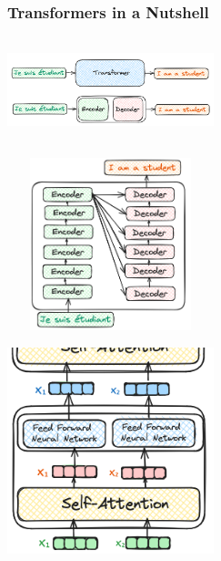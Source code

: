 \documentclass{article}
\begin{document}
\subsubsection{Transformers in a Nutshell}
\begin{minipage}{0.5\textwidth}
\includegraphics[width=6cm, height=3cm]{Transformer/Images/Transformers2.png}
\end{minipage}
\begin{minipage}{0.5\textwidth}
\includegraphics[width=6cm, height=5cm]{Transformer/Images/Transformers3.png}
\end{minipage}
\includegraphics[width=6cm, height=6cm]{Transformer/Images/Transformers4.png}
\end{document}
